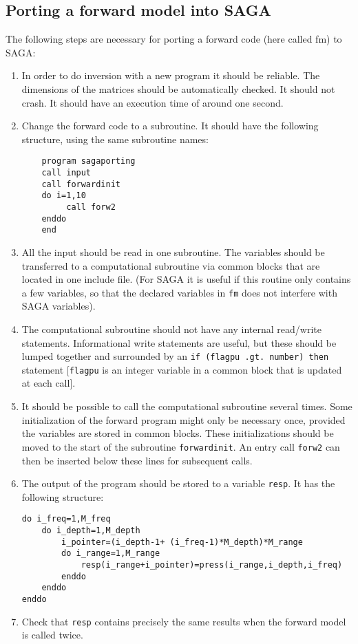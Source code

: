 \documentclass{saclantc}
\begin{document}
\subsection{Porting a forward model into SAGA}
The following steps are necessary for porting a 
forward code (here called fm) to {\sf SAGA}:
\begin{enumerate}
\item In order to do inversion with a new program it should be reliable. The
dimensions of the matrices should be automatically checked. It should not
crash.
It should have an execution time of around one second.

\item Change the forward code to a subroutine.
 It should have the following structure, using the same subroutine
names:

\small
\begin{verbatim}
    program sagaporting
    call input
    call forwardinit
    do i=1,10
         call forw2
    enddo
    end
\end{verbatim}
\normalsize

\item All the input should be read in one subroutine. 
    The variables should be transferred to a computational 
    subroutine via common blocks that are located in one include
    file.
    (For {\sf SAGA} it is useful if this routine only contains a few
    variables, so that the declared variables in {\tt fm} does not 
    interfere with {\sf SAGA} variables).

\item The computational subroutine should not have any internal
    read/write statements.  
    Informational write statements are useful, but these should be
    lumped together and surrounded by an   {\tt if (flagpu .gt.\ number)
then }
    statement [{\tt flagpu} is an integer variable in a common block 
that is updated at each call].  

\item  It should be possible to call the computational subroutine several
    times.
    Some initialization of the forward program might only be 
    necessary once, provided the variables are stored in common
    blocks. These initializations should be moved to the start of the
    subroutine {\tt forwardinit}.  An entry call {\tt forw2} 
    can then be inserted below these lines
    for subsequent calls.
\item The output of the program should be stored to a variable
    {\tt resp}. It has the following structure:
\small
\begin{verbatim}
do i_freq=1,M_freq
    do i_depth=1,M_depth
        i_pointer=(i_depth-1+ (i_freq-1)*M_depth)*M_range
        do i_range=1,M_range
            resp(i_range+i_pointer)=press(i_range,i_depth,i_freq)
        enddo
    enddo
enddo
\end{verbatim}
\normalsize

\item  Check that {\tt resp} contains precisely the same results when the forward model
    is called twice. 

\end{enumerate}
\end{document}
